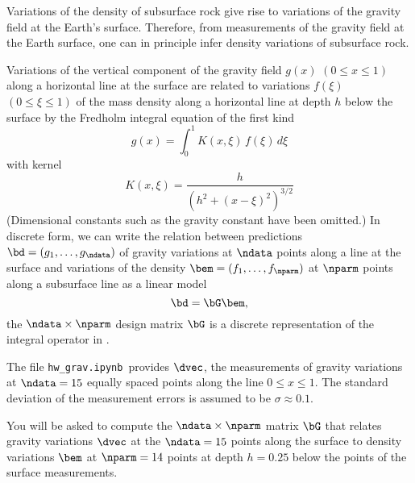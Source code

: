 \documentclass[11pt,titlepage,fleqn]{article}
\newcommand{\tfile}{{\tt hw\_grav.ipynb}}
\newcommand{\numdataG}{15}
\newcommand{\numparmG}{14}
\newcommand{\mv}{\xi}  %
\newcommand{\dv}{x}  %
\newcommand{\dep}{h}
\begin{document}
Variations of the density of subsurface rock give rise to variations of the gravity field at the Earth's surface. Therefore, from measurements of the gravity field at the Earth surface, one can in principle infer density variations of subsurface rock.

Variations of the vertical component of the gravity field $g(\dv)$ $(0 \le \dv \le 1)$ along a horizontal line at the surface are related to variations $f(\mv)$ $(0 \le \mv \le 1)$ of the mass density along a horizontal line at depth $\dep$ below the surface by the Fredholm integral equation of the first kind \citep[\eg][eq.~1.31]{Aster}
%
\begin{equation}
g(\dv) = \int_0^1 K(\dv,\mv)\,f(\mv)\,d\mv
\label{gs}
\end{equation}
%
with kernel
%
\begin{equation}
K(\dv,\mv) = \frac{\dep}{\left(\dep^2 + (\dv-\mv)^2\right)^{3/2}}
\label{Kxy}
\end{equation}
%
(Dimensional constants such as the gravity constant have been omitted.) In discrete form, we can write the relation between predictions $\bd = (g_1,\ldots,g_\ndata)$ of gravity variations at $\ndata$ points along a line at the surface and variations of the density $\bem = (f_1,\ldots,f_\nparm)$ at $\nparm$ points along a subsurface line as a linear model
%
\begin{equation}
\bd = \bG\bem,
\end{equation}
%
the $\ndata \times \nparm$ design matrix $\bG$ is a discrete representation of the integral operator in .

The file \tfile\ provides $\dvec$, the measurements of gravity variations at $\ndata = \numdataG$ equally spaced points along the line $0 \le \dv \le 1$. The standard deviation of the measurement errors is assumed to be $\sigma \approx 0.1$.

You will be asked to compute
the $\ndata \times \nparm$ matrix $\bG$ that relates gravity variations $\dvec$ at the $\ndata=\numdataG$ points along the surface to density variations $\bem$ at $\nparm = \numparmG$ points at depth $\dep = 0.25$ below the points of the surface measurements. 

\end{document}
